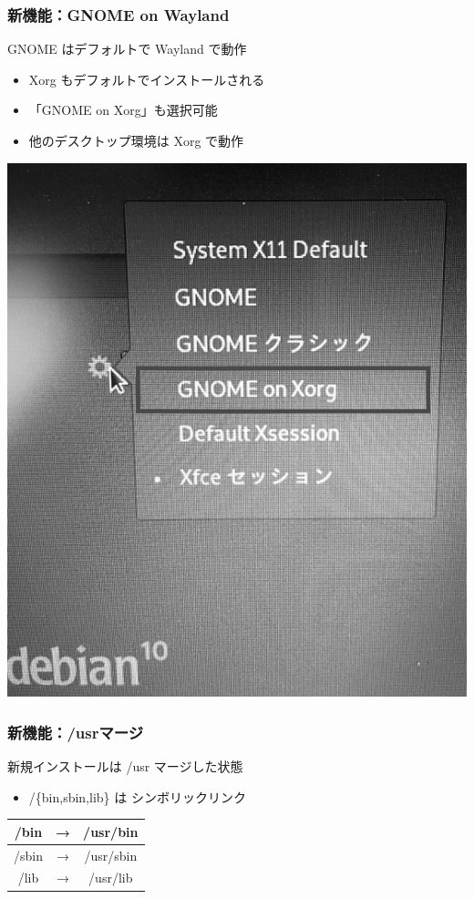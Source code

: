 \documentclass[mingoth,a4paper]{jsarticle}
\begin{document}
\subsubsection{新機能：GNOME on Wayland}

GNOME はデフォルトで Wayland で動作

\begin{itemize}
\item Xorg もデフォルトでインストールされる
\item 「GNOME on Xorg」も選択可能
\item 他のデスクトップ環境は Xorg で動作
\end{itemize}

\begin{center}
  \includegraphics[width=0.5\hsize]{image201902/GDM_GNOME_select_mark_gray.png}
\end{center}



\subsubsection{新機能：/usrマージ}

新規インストールは /usr マージした状態

\begin{itemize}
  \item /\{bin,sbin,lib\} は シンボリックリンク
\end{itemize}

\begin{table}[htb]
  \begin{tabular}{|ccc|}
    \hline
    /bin  & → & /usr/bin \\ \hline
    /sbin & → & /usr/sbin \\ \hline
    /lib  & → & /usr/lib \\
    \hline
  \end{tabular}
\end{table}
\end{document}
